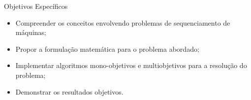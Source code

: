 \documentclass[]{beamer}
\begin{document}
\begin{frame}{Objetivos Específicos}

	\begin{itemize}
		\item Compreender os conceitos envolvendo problemas de sequenciamento de máquinas;
		\item Propor a formulação matemática para o problema abordado;
		\item Implementar algoritmos mono-objetivos e multiobjetivos para a resolução do problema;
		\item Demonstrar os resultados objetivos.
	\end{itemize}
	
\end{frame}

\end{document}
